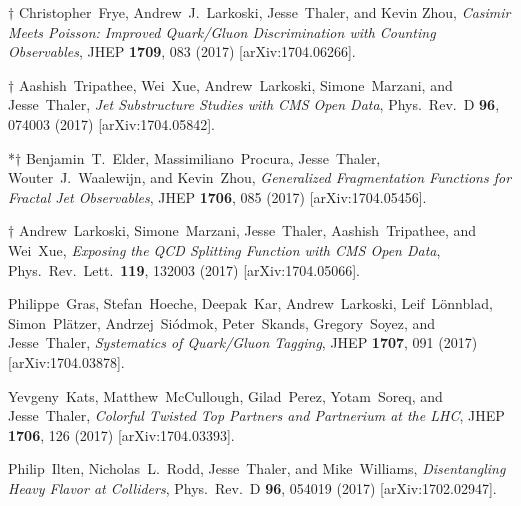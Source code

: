 \documentclass[11pt]{article}
\renewcommand{\bibitem}[1]{\item}
\begin{document}
\begin{list}{[]\addtocounter{jessecount}{-1}}{\leftmargin=3em \itemsep=4pt}
\bibitem{Frye:2017yrw} 
  $\dagger$ Christopher~Frye, Andrew~J.~Larkoski, Jesse~Thaler, and Kevin Zhou, 
  \emph{Casimir Meets Poisson: Improved Quark/Gluon Discrimination with Counting Observables},
  JHEP {\bf 1709}, 083 (2017)
  [arXiv:1704.06266].
  
\bibitem{Tripathee:2017ybi}
  $\dagger$ Aashish~Tripathee, Wei~Xue, Andrew~Larkoski, Simone~Marzani, and Jesse~Thaler,
  \emph{Jet Substructure Studies with CMS Open Data},
  Phys.\ Rev.\ D {\bf 96}, 074003 (2017)
  [arXiv:1704.05842].
  
  
\bibitem{Elder:2017bkd} 
  *$\dagger$ Benjamin~T.~Elder, Massimiliano~Procura, Jesse~Thaler, Wouter~J.~Waalewijn, and Kevin~Zhou, 
  \emph{Generalized Fragmentation Functions for Fractal Jet Observables},
  JHEP {\bf 1706}, 085 (2017)
  [arXiv:1704.05456].

  
\bibitem{Larkoski:2017bvj} 
  $\dagger$  Andrew~Larkoski, Simone~Marzani, Jesse~Thaler, Aashish~Tripathee, and Wei~Xue,
  \emph{Exposing the QCD Splitting Function with CMS Open Data},
  Phys.\ Rev.\ Lett.\  {\bf 119}, 132003 (2017)
 [arXiv:1704.05066].
  
\bibitem{Gras:2017jty} 
  Philippe~Gras, Stefan~Hoeche, Deepak~Kar, Andrew~Larkoski, Leif~L\"onnblad, Simon~Pl\"{a}tzer, Andrzej~Si\'odmok, Peter~Skands, Gregory~Soyez, and Jesse~Thaler,
  \emph{Systematics of Quark/Gluon Tagging},
  JHEP {\bf 1707}, 091 (2017)
  [arXiv:1704.03878].
  
\bibitem{Kats:2017ojr} 
  Yevgeny~Kats, Matthew~McCullough, Gilad~Perez, Yotam~Soreq, and Jesse~Thaler, 
  \emph{Colorful Twisted Top Partners and Partnerium at the LHC},
  JHEP {\bf 1706}, 126 (2017)
  [arXiv:1704.03393].
  
 
\bibitem{Ilten:2017rbd} 
  Philip~Ilten, Nicholas~L.~Rodd, Jesse~Thaler, and Mike~Williams, 
  \emph{Disentangling Heavy Flavor at Colliders},
  Phys.\ Rev.\ D {\bf 96}, 054019 (2017)
  [arXiv:1702.02947].



\end{list}
\end{document}
